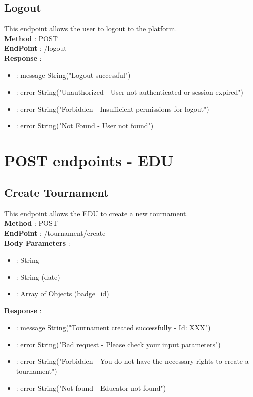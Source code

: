 \subsection*{Logout}
This endpoint allows the user to logout to the platform.\\
\textbf{Method} : POST \\
\textbf{EndPoint} : /logout \\
\textbf{Response} :
\begin{itemize}
    \item {} : message String("Logout successful")
    \item {} : error String("Unauthorized - User not authenticated or session expired")
    \item {} : error String("Forbidden - Insufficient permissions for logout")
    \item {} : error String("Not Found - User not found")
\end{itemize}

\section*{POST endpoints - EDU}
\subsection*{Create Tournament}
This endpoint allows the EDU to create a new tournament.\\
\textbf{Method} : POST \\
\textbf{EndPoint} : /tournament/create \\
\textbf{Body Parameters} :
\begin{itemize}
    \item {} : String
    \item {} : String (date)
    \item {} : Array of Objects (badge\_id)
\end{itemize}
\textbf{Response} :
\begin{itemize}
    \item {} : message String("Tournament created successfully - Id: XXX")
    \item {} : error String("Bad request - Please check your input parameters")
    \item {} : error String("Forbidden - You do not have the necessary rights to create a tournament")
    \item {} : error String("Not found - Educator not found")
\end{itemize}

